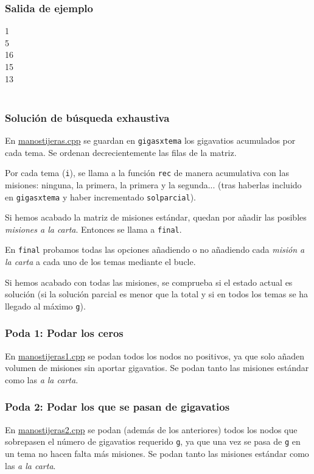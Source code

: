 \documentclass{article}
\newenvironment{caja}{
	\begingroup
	\ttfamily\noindent
	\tabularx{\linewidth}{|X|}\hline
}
{
	\hline\endtabularx
	\normalfont
	\endgroup
}
\begin{document}
	\subsubsection*{Salida de ejemplo}
	\begin{caja}
		1\\
		5\\
		16\\
		15\\
		13\\
	\end{caja}\\

	\newpage
	
	\subsubsection*{Solución de búsqueda exhaustiva}
	En \href{run:manostijeras.cpp}{manostijeras.cpp} se guardan en \texttt{gigasxtema} los gigavatios acumulados por cada tema. Se ordenan decrecientemente las filas de la matriz.
	
	Por cada tema (\texttt{i}), se llama a la función \texttt{rec} de manera acumulativa con las misiones: ninguna, la primera, la primera y la segunda... (tras haberlas incluido en \texttt{gigasxtema} y haber incrementado \texttt{solparcial}).
	
	Si hemos acabado la matriz de misiones estándar, quedan por añadir las posibles \textit{misiones a la carta}. Entonces se llama a \texttt{final}.

	En \texttt{final} probamos todas las opciones añadiendo o no añadiendo cada \textit{misión a la carta} a cada uno de los temas mediante el bucle.
	
	Si hemos acabado con todas las misiones, se comprueba si el estado actual es solución (si la solución parcial es menor que la total y si en todos los temas se ha llegado al máximo \texttt{g}).\\
	
	\subsubsection*{Poda 1: Podar los ceros}
	En \href{run:manostijeras1.cpp}{manostijeras1.cpp} se podan todos los nodos no positivos, ya que solo añaden volumen de misiones sin aportar gigavatios. Se podan tanto las misiones estándar como las \textit{a la carta}.\\
	
	\subsubsection*{Poda 2: Podar los que se pasan de gigavatios}
	En \href{run:manostijeras2.cpp}{manostijeras2.cpp} se podan (además de los anteriores) todos los nodos que sobrepasen el número de gigavatios requerido \texttt{g}, ya que una vez se pasa de \texttt{g} en un tema no hacen falta más misiones. Se podan tanto las misiones estándar como las \textit{a la carta}.\\
	
\end{document}
